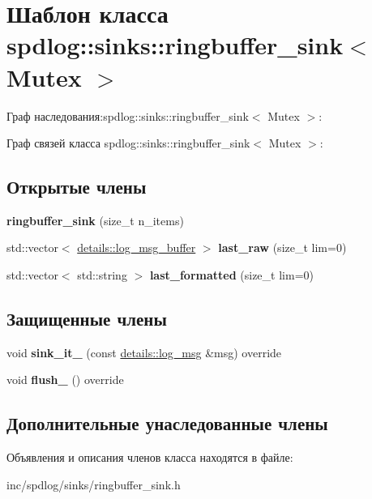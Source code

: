 \hypertarget{classspdlog_1_1sinks_1_1ringbuffer__sink}{}\section{Шаблон класса spdlog\+:\+:sinks\+:\+:ringbuffer\+\_\+sink$<$ Mutex $>$}
\label{classspdlog_1_1sinks_1_1ringbuffer__sink}


Граф наследования\+:spdlog\+:\+:sinks\+:\+:ringbuffer\+\_\+sink$<$ Mutex $>$\+:


Граф связей класса spdlog\+:\+:sinks\+:\+:ringbuffer\+\_\+sink$<$ Mutex $>$\+:
\subsection*{Открытые члены}
\begin{DoxyCompactItemize}
\item 
\mbox{\label{classspdlog_1_1sinks_1_1ringbuffer__sink_a52a805644de6cbb38c4a24df17857046}} 
{\bfseries ringbuffer\+\_\+sink} (size\+\_\+t n\+\_\+items)
\item 
\mbox{\label{classspdlog_1_1sinks_1_1ringbuffer__sink_a252bbf732cd54165d79b89dadbb7a151}} 
std\+::vector$<$ \hyperlink{classspdlog_1_1details_1_1log__msg__buffer}{details\+::log\+\_\+msg\+\_\+buffer} $>$ {\bfseries last\+\_\+raw} (size\+\_\+t lim=0)
\item 
\mbox{\label{classspdlog_1_1sinks_1_1ringbuffer__sink_a48243a02792585f13edc02c359fcf206}} 
std\+::vector$<$ std\+::string $>$ {\bfseries last\+\_\+formatted} (size\+\_\+t lim=0)
\end{DoxyCompactItemize}
\subsection*{Защищенные члены}
\begin{DoxyCompactItemize}
\item 
\mbox{\label{classspdlog_1_1sinks_1_1ringbuffer__sink_a3478132c9f7a564f282cd879fe1c8d1c}} 
void {\bfseries sink\+\_\+it\+\_\+} (const \hyperlink{structspdlog_1_1details_1_1log__msg}{details\+::log\+\_\+msg} \&msg) override
\item 
\mbox{\label{classspdlog_1_1sinks_1_1ringbuffer__sink_a6840180ebe869e04d4bc2a414c74aba9}} 
void {\bfseries flush\+\_\+} () override
\end{DoxyCompactItemize}
\subsection*{Дополнительные унаследованные члены}


Объявления и описания членов класса находятся в файле\+:\begin{DoxyCompactItemize}
\item 
inc/spdlog/sinks/ringbuffer\+\_\+sink.\+h\end{DoxyCompactItemize}
